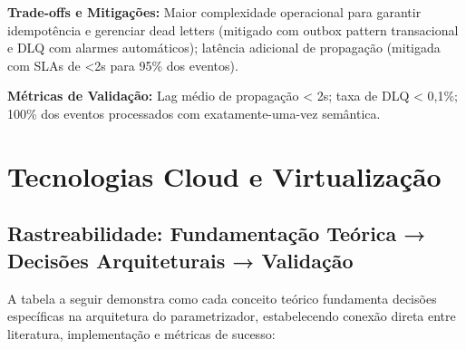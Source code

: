 \textbf{Trade-offs e Mitigações:} Maior complexidade operacional para garantir idempotência e gerenciar dead letters (mitigado com outbox pattern transacional e DLQ com alarmes automáticos); latência adicional de propagação (mitigada com SLAs de <2s para 95\% dos eventos).

\textbf{Métricas de Validação:} Lag médio de propagação < 2s; taxa de DLQ < 0,1\%; 100\% dos eventos processados com exatamente-uma-vez semântica.

\section{Tecnologias Cloud e Virtualização}

\subsection{Rastreabilidade: Fundamentação Teórica → Decisões Arquiteturais → Validação}

A tabela a seguir demonstra como cada conceito teórico fundamenta decisões específicas na arquitetura do parametrizador, estabelecendo conexão direta entre literatura, implementação e métricas de sucesso:

